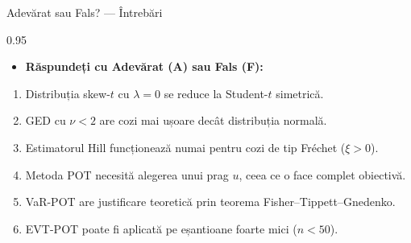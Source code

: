 \documentclass[9pt, aspectratio=169, t]{beamer}
\begin{document}
\begin{frame}{Adevărat sau Fals? --- Întrebări}
    \begin{cminipage}{0.95\textwidth}
    \begin{itemize}\setlength{\itemsep}{0pt}
        \item \textbf{Răspundeți cu Adevărat (A) sau Fals (F):}
    \end{itemize}
    \vspace{0.3cm}
    \begin{enumerate}\setlength{\itemsep}{0pt}
        \item Distribuția skew-$t$ cu $\lambda = 0$ se reduce la Student-$t$ simetrică.
        \item GED cu $\nu < 2$ are cozi mai ușoare decât distribuția normală.
        \item Estimatorul Hill funcționează numai pentru cozi de tip Fr\'{e}chet ($\xi > 0$).
        \item Metoda POT necesită alegerea unui prag $u$, ceea ce o face complet obiectivă.
        \item VaR-POT are justificare teoretică prin teorema Fisher--Tippett--Gnedenko.
        \item EVT-POT poate fi aplicată pe eșantioane foarte mici ($n < 50$).
    \end{enumerate}
    \end{cminipage}
\end{frame}
\end{document}
